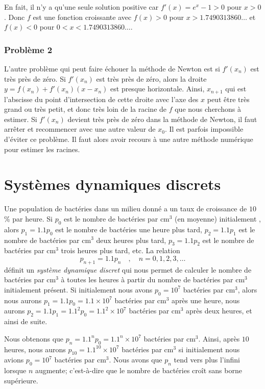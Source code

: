 {\begin{egg}
En fait, il n'y a qu'une seule solution positive car
$f'(x) = e^x-1 >0$ pour $x>0$.  Donc $f$ est une fonction croissante avec
$f(x)>0$ pour $x > 1.7490313860\ldots$ et $f(x)<0$ pour
$0<x<1.7490313860\ldots$.
\end{egg}

\subsubsection{Problème 2}

L'autre problème qui peut faire échouer la méthode
de Newton est si $f'(x_n)$ est très près de zéro.  Si $f'(x_n)$ est
très près de zéro, alors la droite $y = f(x_n) + f'(x_n)(x-x_n)$ est
presque horizontale. Ainsi, $x_{n+1}$ qui est l'abscisse du point
d'intersection de cette droite avec l'axe des $x$ peut être très grand
ou très petit, et donc très loin de la racine de $f$ que nous cherchons
à estimer.  Si $f'(x_n)$ devient très près de zéro dans la méthode de
Newton, il faut arrêter et recommencer avec une autre valeur de $x_0$.
Il est parfois impossible d'éviter ce problème.  Il faut alors avoir
recours à une autre méthode numérique pour estimer les racines.

\section{Syst\`emes dynamiques discrets \life}\label{Sect_SDD}

\begin{egg}
Une population de bactéries dans un milieu donné a un taux de
croissance de $10$\% par heure. Si $p_0$ est le nombre de bactéries
par cm$^3$ (en moyenne) initialement , alors $p_1 = 1.1 p_0$ est le
nombre de bactéries une heure plus tard, $p_2 = 1.1 p_1$ est le nombre
de bactéries par cm$^3$ deux heures plus tard, $p_3 = 1.1 p_2$ est le
nombre de bactéries par cm$^3$ trois heures plus tard, etc.  La relation
\[
p_{n+1} = 1.1 p_n \quad , \quad n=0,1,2,3,\ldots
\]
définit un {\em système dynamique discret} qui nous permet de calculer
le nombre de bactéries par cm$^3$ à toutes les heures à partir du
nombre de bactéries par cm$^3$ initialement présent.  Si initialement
nous avons $p_0 = 10^7$ bactéries par cm$^3$, alors nous aurons
$p_1 = 1.1 p_0 = 1.1 \times 10^7$ bactéries par cm$^3$ après une
heure, nous aurons $p_2 = 1.1 p_1 = 1.1^2 p_0 =1.1^2 \times 10^7$
bactéries par cm$^3$ après deux heures, et ainsi de suite.

Nous obtenons que $p_n = 1.1^n p_0 = 1.1^n \times 10^7$ bactéries par
cm$^3$.  Ainsi, après $10$ heures, nous aurons
$p_{10} = 1.1^{10}\times 10^7$ bactéries par cm$^3$ si initialement
nous avions $p_0 = 10^7$ bactéries par cm$^3$.  Nous avons que $p_n$ tend vers
plus l'infini lorsque $n$ augmente; c'est-à-dire que le nombre de
bactéries croît sans borne supérieure.
\label{sdd_egg1}
\end{egg}

}

